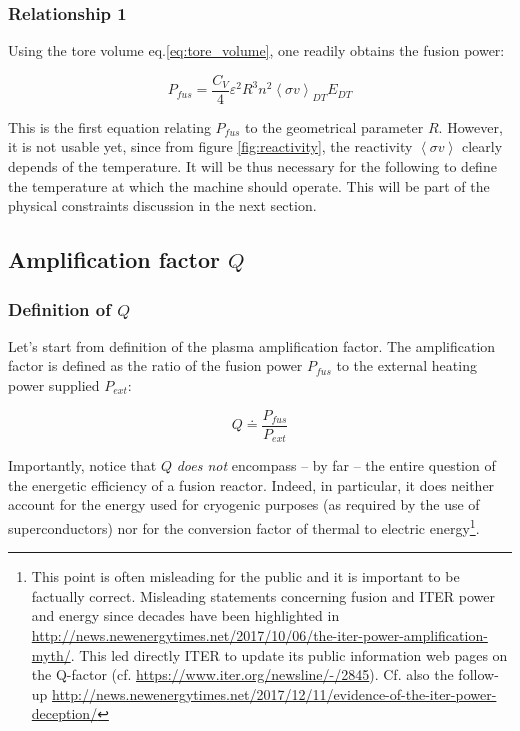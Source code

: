 \subsubsection{Relationship 1}
Using the tore volume eq.\ref{eq:tore_volume}, one readily obtains the fusion power:

\begin{equation}
\boxed{
	P_{fus} = \frac{C_V}{4}
  				\varepsilon^2 R^3
				n^2 \left< \sigma v \right>_{DT} E_{DT}
	}
	\label{eq:FusionPower1}
\end{equation}

This is the first equation relating $P_{fus}$ to the geometrical parameter $R$. However, it is not usable yet, since from figure \ref{fig:reactivity}, the reactivity $\left< \sigma v \right>$ clearly depends of the temperature. It will be thus necessary for the following to define the temperature at which the machine should operate. This will be part of the physical constraints discussion in the next section. 

\subsection{Amplification factor $Q$}


\subsubsection{Definition of $Q$}
Let's start from definition of the plasma amplification factor. The amplification factor is defined as the ratio of the fusion power $P_{fus}$ to the external heating power supplied $P_{ext}$\cite[p.12]{Wesson2004}:

\begin{equation}
	Q \doteq \frac{P_{fus}}{P_{ext}}
\label{eq:definition_Q}
\end{equation}

Importantly, notice that $Q$ \emph{does not} encompass -- by far -- the entire question of the energetic efficiency of a fusion reactor. Indeed, in particular, it does neither account for the energy used for cryogenic purposes (as required by the use of superconductors) nor for the conversion factor of thermal to electric energy\footnote{This point is often misleading for the public and it is important to be factually correct. Misleading statements concerning fusion and ITER power and energy since decades have been highlighted in \url{http://news.newenergytimes.net/2017/10/06/the-iter-power-amplification-myth/}. This led directly ITER to update its public information web pages on the Q-factor (cf. \url{https://www.iter.org/newsline/-/2845}).  Cf. also the follow-up \url{http://news.newenergytimes.net/2017/12/11/evidence-of-the-iter-power-deception/}}.

